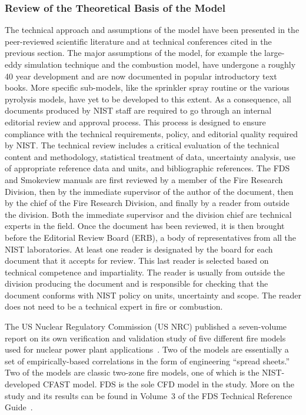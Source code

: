 \documentclass[11pt]{book}
\begin{document}
\subsubsection{Review of the Theoretical Basis of the Model}
\label{JustAA}

The technical approach and assumptions of the model have been presented in the peer-reviewed scientific literature and at technical conferences cited in the previous section. The major assumptions of the model, for example the large-eddy simulation technique and the combustion model, have undergone a roughly 40 year development and are now documented in popular introductory text books. More specific sub-models, like the sprinkler spray routine or the various pyrolysis models, have yet to be developed to this extent. As a consequence, all documents produced by NIST staff are required to go through an internal editorial review and approval process. This process is designed to ensure compliance with the technical requirements, policy, and editorial quality required by NIST. The technical review includes a critical evaluation of the technical content and methodology, statistical treatment of data, uncertainty analysis, use of appropriate reference data and units, and bibliographic references. The FDS and Smokeview manuals are first reviewed by a member of the Fire Research Division, then by the immediate supervisor of the author of the document, then by the chief of the Fire Research Division, and finally by a reader from outside the division. Both the immediate supervisor and the division
chief are technical experts in the field. Once the document has been reviewed, it is then brought before the Editorial Review Board (ERB), a body of representatives from all the NIST laboratories. At least one reader is designated by the board for each document that it accepts for review. This last reader is selected based on technical competence and impartiality. The reader is usually from outside the division producing the document and is responsible for checking that the document conforms with NIST policy on units, uncertainty and scope. The reader does not need to be a technical expert in fire or combustion.

The US Nuclear Regulatory Commission (US NRC) published a seven-volume report on its own verification and validation study of five different fire models used for nuclear power plant applications~\cite{NUREG_1824_Sup_1}. Two of the models are essentially a set of empirically-based correlations in the form of engineering ``spread sheets.'' Two of the models are classic two-zone fire models, one of which is the NIST-developed CFAST model. FDS is the sole CFD model in the study. More on the study and its results can be found in Volume~3 of the FDS Technical Reference Guide~\cite{FDS_Tech_Guide}.
\end{document}
